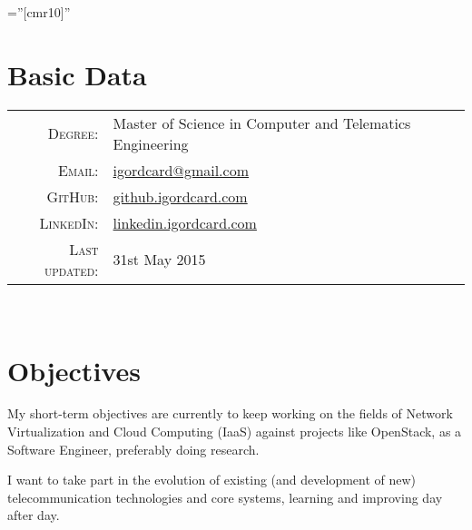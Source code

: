 \documentclass[letter,10pt]{article} %
\begin{document}
\pagestyle{empty} %

\font\fb=''[cmr10]'' %



\par{\bigskip\par} %

\section{Basic Data}

\begin{tabular}{rl}
\textsc{Degree:} & Master of Science in Computer and Telematics Engineering\\
\textsc{Email:} & \href{mailto:igordcard+cv@gmail.com}{igordcard@gmail.com}\\
\textsc{GitHub:} & \href{http://github.igordcard.com}{github.igordcard.com}\\
\textsc{LinkedIn:} & \href{http://linkedin.igordcard.com}{linkedin.igordcard.com}\\
\textsc{Last updated:} & 31st May 2015\\
\end{tabular} \\


\section{Objectives}

My short-term objectives are currently to keep working on the fields of Network Virtualization and Cloud Computing (IaaS) against projects like OpenStack, as a Software Engineer, preferably doing research.

I want to take part in the evolution of existing (and development of new) telecommunication technologies 
and core systems, learning and improving day after day. \\


\end{document}
